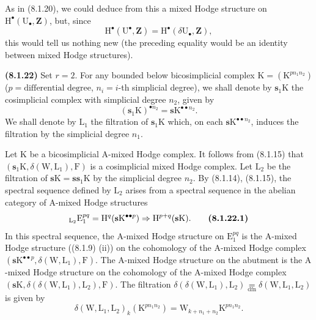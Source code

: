 \documentclass[11pt,leqno]{article}
\begin{document}
As in (8.1.20), we could deduce from this a mixed Hodge structure on \(\mathrm{H}^{\bullet}(\mathrm{U}_{\bullet},\mathbf{Z})\), but, since
\[
\mathrm{H}^{\bullet}(\mathrm{U}^{\bullet},\mathbf{Z})
=
\mathrm{H}^{\bullet}(\delta\mathrm{U}_{\bullet},\mathbf{Z}),
\]
this would tell us nothing new (the preceding equality would be an identity between mixed Hodge structures).

\textbf{(8.1.22)} Set \(r=2\). For any bounded below bicosimplicial complex \(\mathrm{K}=(\mathrm{K}^{p n_{1} n_{2}})\) (\(p=\text{differential degree}\), \(n_i=i\)-th simplicial degree), we shall denote by \(\mathbf{s}_{1}\mathrm{K}\) the cosimplicial complex with simplicial degree \(n_{2}\), given by
\[
(\mathbf{s}_{1}\mathrm{K})^{\bullet n_{2}}
=
\mathbf{s}\mathrm{K}^{\bullet\bullet n_{2}}.
\]
We shall denote by \(\mathrm{L}_{1}\) the filtration of \(\mathbf{s}_{1}\mathrm{K}\) which, on each \(\mathbf{s}\mathrm{K}^{\bullet\bullet n_{2}}\), induces the filtration by the simplicial degree \(n_{1}\).

Let \(\mathrm{K}\) be a bicosimplicial \(\mathrm{A}\)-mixed Hodge complex. It follows from (8.1.15) that \((\mathbf{s}_{1}\mathrm{K},\delta(\mathrm{W},\mathrm{L}_{1}),\mathrm{F})\) is a cosimplicial mixed Hodge complex. Let \(\mathrm{L}_{2}\) be the filtration of \(\mathbf{s}\mathrm{K}=\mathbf{s}\mathbf{s}_{1}\mathrm{K}\) by the simplicial degree \(n_{2}\). By (8.1.14), (8.1.15), the spectral sequence defined by \(\mathrm{L}_{2}\) arises from a spectral sequence in the abelian category of \(\mathrm{A}\)-mixed Hodge structures
\[
{}_{\mathrm{L}_{2}}\mathrm{E}_{1}^{pq}
=
\mathrm{H}^{q}(\mathbf{s}\mathrm{K}^{\bullet\bullet p})
\Rightarrow
\mathrm{H}^{p+q}(\mathbf{s}\mathrm{K}).
\tag*{\textbf{(8.1.22.1)}}
\]
In this spectral sequence, the \(\mathrm{A}\)-mixed Hodge structure on \(\mathrm{E}_{1}^{pq}\) is the \(\mathrm{A}\)-mixed Hodge structure ((8.1.9) (ii)) on the cohomology of the \(\mathrm{A}\)-mixed Hodge complex \((\mathbf{s}\mathrm{K}^{\bullet\bullet p},\delta(\mathrm{W},\mathrm{L}_{1}),\mathrm{F})\). The \(\mathrm{A}\)-mixed Hodge structure on the abutment is the \(\mathrm{A}\)-mixed Hodge structure on the cohomology of the \(\mathrm{A}\)-mixed Hodge complex \((\mathbf{s}\mathrm{K},\delta(\delta(\mathrm{W},\mathrm{L}_{1}),\mathrm{L}_{2}),\mathrm{F})\). The filtration \(\delta(\delta(\mathrm{W},\mathrm{L}_{1}),\mathrm{L}_{2})\underset{\mathrm{dfn}}{=}\delta(\mathrm{W},\mathrm{L}_{1},\mathrm{L}_{2})\) is given by
\[
\delta(\mathrm{W},\mathrm{L}_{1},\mathrm{L}_{2})_{k}
(\mathrm{K}^{p n_{1} n_{2}})
=
\mathrm{W}_{k+n_{1}+n_{2}}\mathrm{K}^{p n_{1} n_{2}}.
\]
\end{document}
